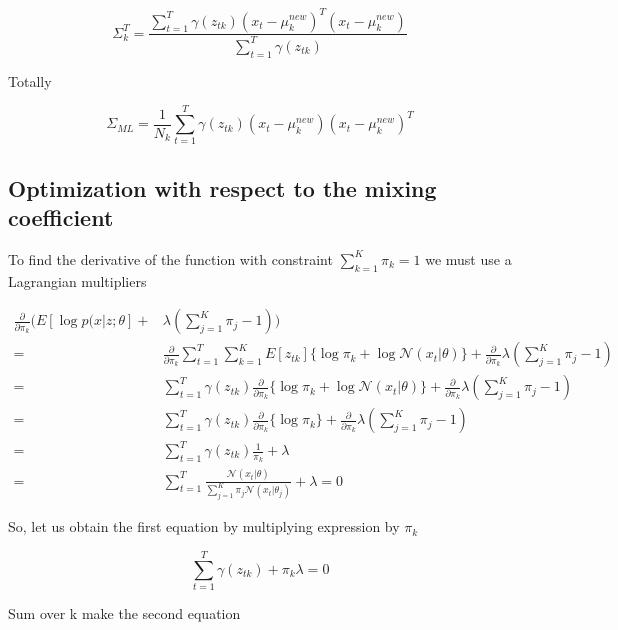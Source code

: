 \documentclass{article}
\begin{document}
\begin{equation}
\Sigma_k^T = \frac{\sum_{t=1}^T \gamma(z_{tk}) (x_t - \mu_k^{new})^T (x_t - \mu_k^{new})}{\sum_{t=1}^T \gamma(z_{tk})}
\end{equation}

Totally

\begin{equation}
\Sigma_{ML} = \frac{1}{N_k}\sum_{t=1}^T \gamma(z_{tk}) (x_t - \mu_k^{new}) (x_t - \mu_k^{new})^T
\end{equation}

\subsection{Optimization with respect to the mixing coefficient}

To find the derivative of the function with constraint $\sum_{k=1}^K\pi_k = 1$ we must use a Lagrangian multipliers

\begin{equation}
\begin{aligned}
\frac{\partial}{\partial \pi_k}( E[\log p(x|z;\theta] + & \lambda(\sum_{j=1}^K \pi_j - 1)) \\ = & 
\frac{\partial}{\partial \pi_k}\sum_{t=1}^T \sum_{k=1}^K
E[z_{tk}]\{\log \pi_k + \log \mathcal{N}(x_t|\theta)\} + \frac{\partial}{\partial \pi_k}\lambda(\sum_{j=1}^K \pi_j - 1)
\\ = &  
\sum_{t=1}^T
\gamma(z_{tk})\frac{\partial}{\partial \pi_k}\{\log \pi_k + \log \mathcal{N}(x_t|\theta)\} + \frac{\partial}{\partial \pi_k} \lambda(\sum_{j=1}^K \pi_j - 1)
\\ = &
\sum_{t=1}^T 
\gamma(z_{tk})\frac{\partial}{\partial \pi_k}\{\log \pi_k\} + \frac{\partial}{\partial \pi_k} \lambda(\sum_{j=1}^K \pi_j - 1) 
\\ = &
\sum_{t=1}^T
\gamma(z_{tk})\frac{1}{\pi_k} + \lambda 
\\ = &
\sum_{t=1}^T
\frac{\mathcal{N}(x_t|\theta)}{\sum_{j=1}^K\pi_j\mathcal{N}(x_t|\theta_j)} + \lambda = 0
\end{aligned}
\end{equation}

So, let us obtain the first equation by multiplying expression by $\pi_k$

\begin{equation}
\sum_{t=1}^T \gamma(z_{tk}) + \pi_k \lambda = 0
\end{equation}

Sum over k make the second equation
\end{document}

